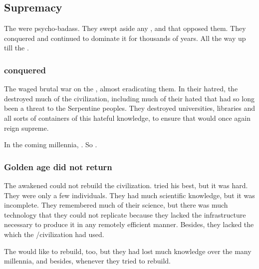\subsection{\Draconian Supremacy}
The \dragons were psycho-badass. 
They swept aside any \quiljaaran, \aryothim and \vorcanths that opposed them. 
They conquered \Miith and continued to dominate it for thousands of years. 
All the way up till the \secondbanewar. 





\subsubsection{\Aryothim conquered}
The \dragons waged brutal war on the \aryothim, almost eradicating them. 
In their hatred, the \dragons destroyed much of the \aryoth civilization, including much of their hated  that had so long been a threat to the Serpentine peoples.
They destroyed universities, libraries and all sorts of containers of this hateful \aryoth knowledge, to ensure that \dragons would once again reign supreme. 

In the coming millennia, . 
So . 





\subsubsection{Golden age did not return}
The awakened \dragons could not rebuild the \ophidian civilization. 
\Nexagglachel tried his best, but it was hard. 
They were only a few individuals.
They had much scientific knowledge, but it was incomplete.
They remembered much of their science, but there was much technology that they could not replicate because they lacked the infrastructure necessary to produce it in any remotely efficient manner. 
Besides, they lacked the  which the \ophidian/\draconian civilization had used. 

The \ophidians would like to rebuild, too, but they had lost much knowledge over the many millennia, and besides,  whenever they tried to rebuild.

